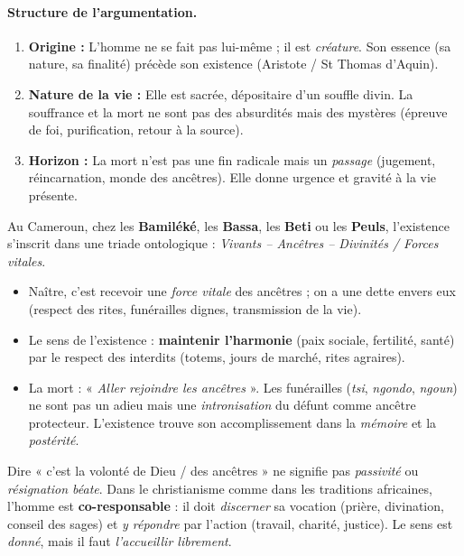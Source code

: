 \documentclass[11pt]{article}
\newcommand{\cle}[1]{{\popxbold\color{popdark}#1}}
\begin{document}
\paragraph{Structure de l'argumentation.}
\begin{enumerate}
    \item \textbf{Origine :} L'homme ne se fait pas lui-même ; il est \emph{créature}. Son essence (sa nature, sa finalité) précède son existence (Aristote / St Thomas d'Aquin).
    \item \textbf{Nature de la vie :} Elle est sacrée, dépositaire d'un souffle divin. La souffrance et la mort ne sont pas des absurdités mais des mystères (épreuve de foi, purification, retour à la source).
    \item \textbf{Horizon :} La mort n'est pas une fin radicale mais un \emph{passage} (jugement, réincarnation, monde des ancêtres). Elle donne urgence et gravité à la vie présente.
\end{enumerate}

\begin{exemplebox}
Au Cameroun, chez les \textbf{Bamiléké}, les \textbf{Bassa}, les \textbf{Beti} ou les \textbf{Peuls}, l'existence s'inscrit dans une \cle{triade ontologique} : \emph{Vivants -- Ancêtres -- Divinités / Forces vitales}.
\begin{itemize}
    \item Naître, c'est recevoir une \emph{force vitale} des ancêtres ; on a une \cle{dette} envers eux (respect des rites, funérailles dignes, transmission de la vie).
    \item Le sens de l'existence : \textbf{maintenir l'harmonie} (paix sociale, fertilité, santé) par le respect des interdits (\cle{totems}, \cle{jours de marché}, rites agraires).
    \item La mort : « \emph{Aller rejoindre les ancêtres} ». Les funérailles (\emph{tsi}, \emph{ngondo}, \emph{ngoun}) ne sont pas un adieu mais une \emph{intronisation} du défunt comme ancêtre protecteur. L'existence trouve son accomplissement dans la \emph{mémoire} et la \emph{postérité}.
\end{itemize}
\end{exemplebox}

\begin{attention}
Dire « c'est la volonté de Dieu / des ancêtres » ne signifie pas \emph{passivité} ou \emph{résignation béate}. Dans le christianisme comme dans les traditions africaines, l'homme est \textbf{co-responsable} : il doit \emph{discerner} sa vocation (prière, divination, conseil des sages) et \emph{y répondre} par l'action (travail, charité, justice). Le sens est \emph{donné}, mais il faut \emph{l'accueillir librement}.
\end{attention}
\end{document}
